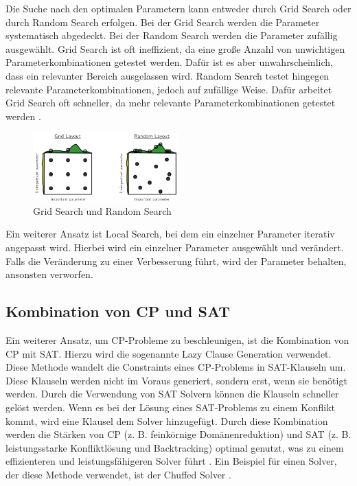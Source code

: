 Die Suche nach den optimalen Parametern kann entweder durch Grid Search oder
durch Random Search erfolgen. Bei der Grid Search werden die Parameter
systematisch abgedeckt. Bei der Random Search werden die Parameter zufällig
ausgewählt. Grid Search ist oft ineffizient, da eine große Anzahl von
unwichtigen Parameterkombinationen getestet werden. Dafür ist es aber
unwahrscheinlich, dass ein relevanter Bereich ausgelassen wird. Random Search
testet hingegen relevante Parameterkombinationen, jedoch auf zufällige Weise.
Dafür arbeitet Grid Search oft schneller, da mehr relevante
Parameterkombinationen getestet werden \cite[39]{kotth23pr}.

\begin{figure}[h]
    \centering
    \includegraphics[width=0.5\textwidth]{figures/Grid Search vs. Random Search [kotth23pr].PNG}
    \caption{Grid Search und Random Search \cite[39]{kotth23pr}}
    \label{fig:bild}
\end{figure}

Ein weiterer Ansatz ist Local Search, bei dem ein einzelner Parameter iterativ
angepasst wird. Hierbei wird ein einzelner Parameter ausgewählt und verändert.
Falls die Veränderung zu einer Verbesserung führt, wird der Parameter behalten,
ansonsten verworfen.


  
\subsection{Kombination von CP und SAT}
\label{sec:Kombination-von-CP-und-SAT}

Ein weiterer Ansatz, um CP-Probleme zu beschleunigen, ist die Kombination von CP
mit SAT. Hierzu wird die sogenannte Lazy Clause Generation verwendet. Diese
Methode wandelt die Constraints eines CP-Problems in SAT-Klauseln um. Diese
Klauseln werden nicht im Voraus generiert, sondern erst, wenn sie benötigt
werden. Durch die Verwendung von SAT Solvern können die Klauseln schneller
gelöst werden. Wenn es bei der Lösung eines SAT-Problems zu einem Konflikt
kommt, wird eine Klausel dem Solver hinzugefügt. Durch diese Kombination werden
die Stärken von CP (z. B. feinkörnige Domänenreduktion) und SAT (z. B.
leistungsstarke Konfliktlösung und Backtracking) optimal genutzt, was zu einem
effizienteren und leistungsfähigeren Solver führt \cite[5]{goosjo}. Ein Beispiel
für einen Solver, der diese Methode verwendet, ist der Chuffed Solver
\cite{Chuff24co}.


